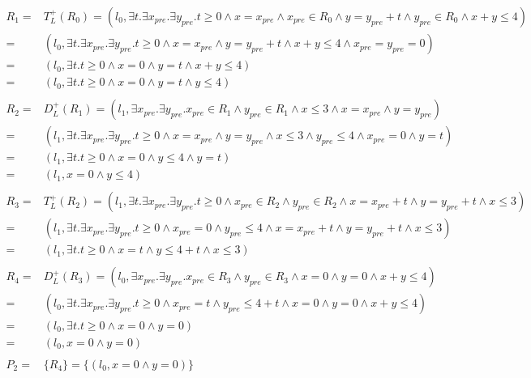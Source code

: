 
\begin{align*}
R_1 = & T_L^+(R_0) = (l_0, \exists t. \exists x_{pre}. \exists y_{pre}. t\ge 0 \wedge x = x_{pre} \wedge x_{pre}\in R_0 \wedge y = y_{pre} + t \wedge y_{pre}\in R_0 \wedge x+y\le 4) \\
= & (l_0, \exists t. \exists x_{pre}. \exists y_{pre}. t\ge 0 \wedge x = x_{pre} \wedge y = y_{pre} + t \wedge x+y\le 4 \wedge x_{pre} = y_{pre} = 0)\\
= & (l_0, \exists t. t\ge 0 \wedge x = 0 \wedge y = t \wedge x+y\le 4)\\
= & (l_0, \exists t. t\ge 0 \wedge x = 0 \wedge y = t \wedge y\le 4)\\\\
R_2 = & D_L^+(R_1) = (l_1, \exists x_{pre}. \exists y_{pre}. x_{pre}\in R_1 \wedge y_{pre}\in R_1 \wedge x\le 3 \wedge x=x_{pre}\wedge y=y_{pre})\\
= & (l_1, \exists t. \exists x_{pre}. \exists y_{pre}. t\ge 0 \wedge x=x_{pre} \wedge y = y_{pre} \wedge x \le 3 \wedge y_{pre} \le 4 \wedge x_{pre} = 0 \wedge y = t)\\
= & (l_1, \exists t. t\ge 0 \wedge x=0 \wedge y \le 4 \wedge y = t)\\
= & (l_1, x=0 \wedge y \le 4)\\\\
R_3 = & T_L^+(R_2) = (l_1, \exists t. \exists x_{pre}. \exists y_{pre}. t\ge 0 \wedge x_{pre} \in R_2 \wedge y_{pre} \in R_2 \wedge x = x_{pre} + t \wedge y = y_{pre} + t \wedge x\le 3)\\
= & (l_1, \exists t. \exists x_{pre}. \exists y_{pre}. t\ge 0 \wedge x_{pre} = 0 \wedge y_{pre} \le 4 \wedge x = x_{pre} + t \wedge y = y_{pre} + t \wedge x\le 3)\\
= & (l_1, \exists t. t\ge 0 \wedge x = t \wedge y \le 4 + t \wedge x\le 3)\\\\
R_4 = & D_L^+(R_3) = (l_0, \exists x_{pre}. \exists y_{pre}. x_{pre} \in R_3 \wedge y_{pre} \in R_3 \wedge x=0 \wedge y=0 \wedge x+y\le 4)\\
= & (l_0, \exists t. \exists x_{pre}. \exists y_{pre}. t \ge 0 \wedge x_{pre} = t \wedge y_{pre} \le 4 +t \wedge x=0 \wedge y=0 \wedge x+y\le 4)\\
= & (l_0, \exists t. t \ge 0 \wedge x=0 \wedge y=0)\\
= & (l_0, x=0 \wedge y=0)\\\\
P_2 = & \{R_4\}= \{(l_0, x=0 \wedge y=0)\}
\end{align*}